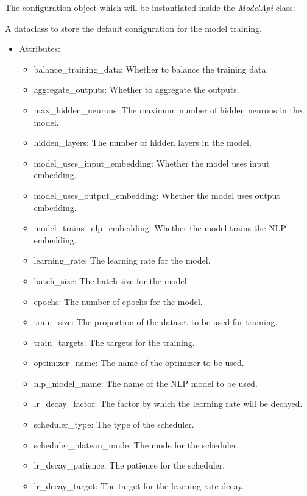 \documentclass[a4paper, 11pt]{report}
\begin{document}
   The configuration object which will be instantiated inside the \textit{ModelApi} class:
   \begin{tcolorbox}[title=ConfigRun - From the Docs]
    A dataclass to store the default configuration for the model training.

    \begin{itemize}
        \item Attributes:
        \begin{itemize}
            \item balance\_training\_data: Whether to balance the training data.
            \item aggregate\_outputs: Whether to aggregate the outputs.
            \item max\_hidden\_neurons: The maximum number of hidden neurons in the model.
            \item hidden\_layers: The number of hidden layers in the model.
            \item model\_uses\_input\_embedding: Whether the model uses input embedding.
            \item model\_uses\_output\_embedding: Whether the model uses output embedding.
            \item model\_trains\_nlp\_embedding: Whether the model trains the NLP embedding.
            \item learning\_rate: The learning rate for the model.
            \item batch\_size: The batch size for the model.
            \item epochs: The number of epochs for the model.
            \item train\_size: The proportion of the dataset to be used for training.
            \item train\_targets: The targets for the training.
            \item optimizer\_name: The name of the optimizer to be used.
            \item nlp\_model\_name: The name of the NLP model to be used.
            \item lr\_decay\_factor: The factor by which the learning rate will be decayed.
            \item scheduler\_type: The type of the scheduler.
            \item scheduler\_plateau\_mode: The mode for the scheduler.
            \item lr\_decay\_patience: The patience for the scheduler.
            \item lr\_decay\_target: The target for the learning rate decay.

\end{itemize}
\end{itemize}
\end{tcolorbox}
\end{document}
